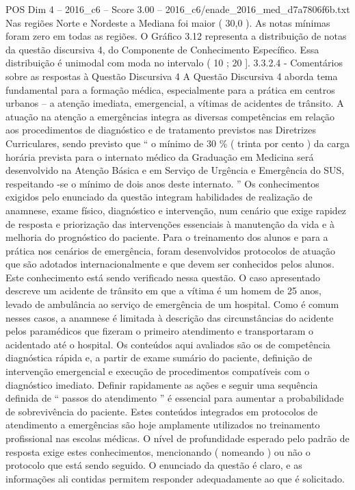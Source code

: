 \begin{textsample}{POS Dim 4 – 2016\_c6 – Score 3.00 – 2016\_c6/enade\_2016\_med\_d7a7806f6b.txt}
Nas regiões Norte e Nordeste a Mediana foi maior ( 30,0 ).
As notas mínimas foram zero em todas as regiões.
O Gráfico 3.12 representa a distribuição de notas da questão discursiva 4, do Componente de Conhecimento Específico.
Essa distribuição é unimodal com moda no intervalo ( 10 ; 20 ]. 3.3.2.4 - Comentários sobre as respostas à Questão Discursiva 4 A Questão Discursiva 4 aborda tema fundamental para a formação médica, especialmente para a prática em centros urbanos – a atenção imediata, emergencial, a vítimas de acidentes de trânsito.
A atuação na atenção a emergências integra as diversas competências em relação aos procedimentos de diagnóstico e de tratamento previstos nas Diretrizes Curriculares, sendo previsto que “ o mínimo de 30 \% ( trinta por cento ) da carga horária prevista para o internato médico da Graduação em Medicina será desenvolvido na Atenção Básica e em Serviço de Urgência e Emergência do SUS, respeitando -se o mínimo de dois anos deste internato. ” Os conhecimentos exigidos pelo enunciado da questão integram habilidades de realização de anamnese, exame físico, diagnóstico e intervenção, num cenário que exige rapidez de resposta e priorização das intervenções essenciais à manutenção da vida e à melhoria do prognóstico do paciente.
Para o treinamento dos alunos e para a prática nos cenários de emergência, foram desenvolvidos protocolos de atuação que são adotados internacionalmente e que devem ser conhecidos pelos alunos.
Este conhecimento está sendo verificado nessa questão.
O caso apresentado descreve um acidente de trânsito em que a vítima é um homem de 25 anos, levado de ambulância ao serviço de emergência de um hospital.
Como é comum nesses casos, a anamnese é limitada à descrição das circunstâncias do acidente pelos paramédicos que fizeram o primeiro atendimento e transportaram o acidentado até o hospital.
Os conteúdos aqui avaliados são os de competência diagnóstica rápida e, a partir de exame sumário do paciente, definição de intervenção emergencial e execução de procedimentos compatíveis com o diagnóstico imediato.
Definir rapidamente as ações e seguir uma sequência definida de “ passos do atendimento ” é essencial para aumentar a probabilidade de sobrevivência do paciente.
Estes conteúdos integrados em protocolos de atendimento a emergências são hoje amplamente utilizados no treinamento profissional nas escolas médicas.
O nível de profundidade esperado pelo padrão de resposta exige estes conhecimentos, mencionando ( nomeando ) ou não o protocolo que está sendo seguido.
O enunciado da questão é claro, e as informações ali contidas permitem responder adequadamente ao que é solicitado.

\end{textsample}
